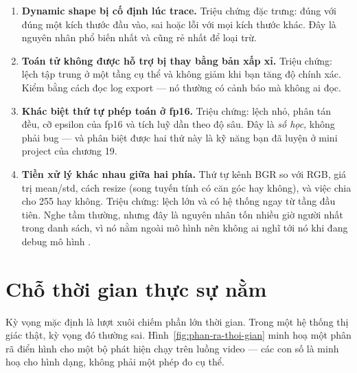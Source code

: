 \documentclass[../../deep_learning.tex]{subfiles}
\begin{document}
\begin{enumerate}
\item \textbf{Dynamic shape bị cố định lúc trace.} Triệu chứng đặc trưng: đúng với đúng một kích thước đầu vào, sai hoặc lỗi với mọi kích thước khác. Đây là nguyên nhân phổ biến nhất và cũng rẻ nhất để loại trừ.
\item \textbf{Toán tử không được hỗ trợ bị thay bằng bản xấp xỉ.} Triệu chứng: lệch tập trung ở một tầng cụ thể và không giảm khi bạn tăng độ chính xác. Kiểm bằng cách đọc log export --- nó thường có cảnh báo mà không ai đọc.
\item \textbf{Khác biệt thứ tự phép toán ở fp16.} Triệu chứng: lệch nhỏ, phân tán đều, cỡ epsilon của fp16 và tích luỹ dần theo độ sâu. Đây là \emph{số học}, không phải bug --- và phân biệt được hai thứ này là kỹ năng bạn đã luyện ở mini project của chương 19.
\item \textbf{Tiền xử lý khác nhau giữa hai phía.} Thứ tự kênh BGR so với RGB, giá trị mean/std, cách resize (song tuyến tính có căn góc hay không), và việc chia cho 255 hay không. Triệu chứng: lệch lớn và có hệ thống ngay từ tầng đầu tiên. Nghe tầm thường, nhưng đây là nguyên nhân tốn nhiều giờ người nhất trong danh sách, vì nó nằm ngoài mô hình nên không ai nghĩ tới nó khi đang debug mô hình \cite{sculley2015hidden}.
\end{enumerate}

\section{Chỗ thời gian thực sự nằm}
Kỳ vọng mặc định là lượt xuôi chiếm phần lớn thời gian. Trong một hệ thống thị giác thật, kỳ vọng đó thường sai. Hình~\ref{fig:phan-ra-thoi-gian} minh hoạ một phân rã điển hình cho một bộ phát hiện chạy trên luồng video --- các con số là minh hoạ cho hình dạng, không phải một phép đo cụ thể.
\end{document}
